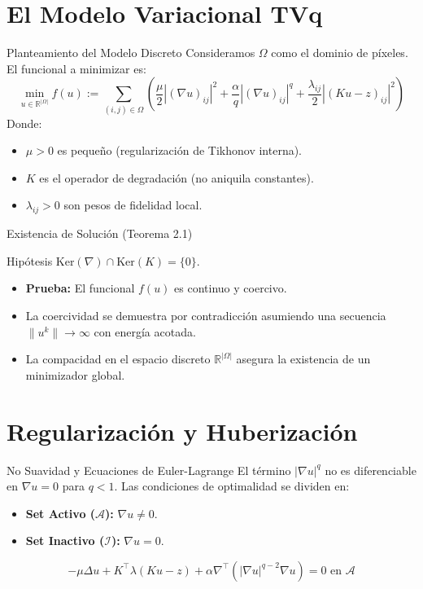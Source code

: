 \documentclass[10pt, aspectratio=169, xcolor={dvipsnames}]{beamer}
\begin{document}
\section{El Modelo Variacional TVq}

\begin{frame}{Planteamiento del Modelo Discreto}
    Consideramos $\Omega$ como el dominio de píxeles. El funcional a minimizar es:
    \begin{equation}
        \min_{u \in \mathbb{R}^{|\Omega|}} f(u) := \sum_{(i,j) \in \Omega} \left( \frac{\mu}{2} |(\nabla u)_{ij}|^2 + \frac{\alpha}{q} |(\nabla u)_{ij}|^q + \frac{\lambda_{ij}}{2} |(Ku - z)_{ij}|^2 \right)
    \end{equation}
    Donde:
    \begin{itemize}
        \item $\mu > 0$ es pequeño (regularización de Tikhonov interna).
        \item $K$ es el operador de degradación (no aniquila constantes).
        \item $\lambda_{ij} > 0$ son pesos de fidelidad local.
    \end{itemize}
\end{frame}

\begin{frame}{Existencia de Solución (Teorema 2.1)}
    \begin{block}{Hipótesis}
        $\text{Ker}(\nabla) \cap \text{Ker}(K) = \{0\}$.
    \end{block}
    \begin{itemize}
        \item \textbf{Prueba:} El funcional $f(u)$ es continuo y coercivo.
        \item La coercividad se demuestra por contradicción asumiendo una secuencia $\|u^k\| \to \infty$ con energía acotada.
        \item La compacidad en el espacio discreto $\mathbb{R}^{|\Omega|}$ asegura la existencia de un minimizador global.
    \end{itemize}
\end{frame}

\section{Regularización y Huberización}

\begin{frame}{No Suavidad y Ecuaciones de Euler-Lagrange}
    El término $|\nabla u|^q$ no es diferenciable en $\nabla u = 0$ para $q < 1$.
    Las condiciones de optimalidad se dividen en:
    \begin{itemize}
        \item \textbf{Set Activo ($\mathcal{A}$):} $\nabla u \neq 0$.
        \item \textbf{Set Inactivo ($\mathcal{I}$):} $\nabla u = 0$.
    \end{itemize}
    \[ -\mu\Delta u + K^\top \lambda(Ku - z) + \alpha \nabla^\top (|\nabla u|^{q-2}\nabla u) = 0 \text{ en } \mathcal{A} \]
\end{frame}
\end{document}
